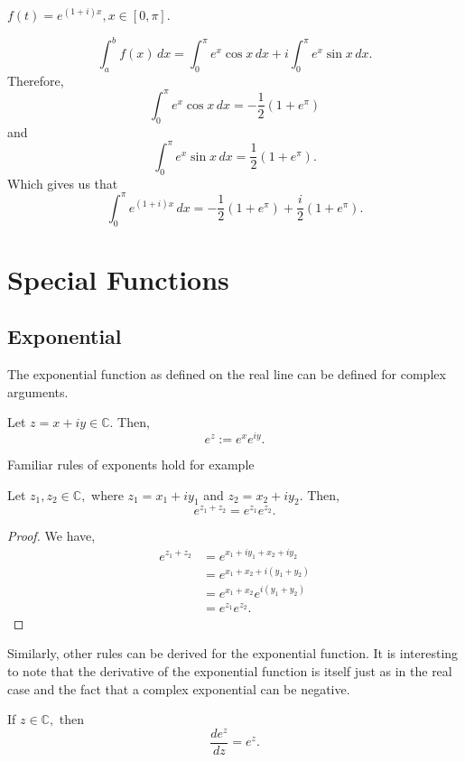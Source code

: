 \documentclass[12pt]{book}
\begin{document}
\begin{exmp}
    $f(t) = e^{(1 + i)x}, x \in [0, \pi].$
\end{exmp}
\[
    \int_{a}^{b} f(x)\,dx = \int_{0}^{\pi} e^{x}\cos x\,dx + i\int_{0}^{\pi} e^{x}\sin x\,dx.
\]
Therefore,
\[
    \int_{0}^{\pi} e^{x}\cos x\,dx = -\frac{1}{2}(1 + e^{\pi})
\]
and
\[
    \int_{0}^{\pi} e^{x}\sin x\,dx = \frac{1}{2}(1 + e^{\pi}).
\]
Which gives us that 
\[
    \int_{0}^{\pi} e^{(1 + i)x}\,dx = -\frac{1}{2}(1 + e^{\pi}) + \frac{i}{2}(1 + e^{\pi}).
\]

\section{Special Functions}
\subsection{Exponential}
The exponential function as defined on the real line can be defined for complex arguments. 
\begin{defn}
    Let $z = x + iy \in \mathbb{C}.$ Then,
    \[
        e^{z} := e^{x}e^{iy}.
    \]
\end{defn}
Familiar rules of exponents hold for example 
\begin{thm}
    Let $z_1, z_2 \in \mathbb{C},$ where $z_1 = x_1 + iy_1$ and $z_2 = x_2 + iy_2$. Then,
    \[
        e^{z_1 + z_2} = e^{z_1}e^{z_2}.
    \]
\end{thm}
\begin{proof}
    We have,
    \begin{align*}
        e^{z_1 + z_2}
            &=
                e^{x_1 + iy_1 + x_2 + iy_2}\\
            &=
                e^{x_1 + x_2 + i(y_1 + y_2)}\\
            &=
                e^{x_1 + x_2}e^{i(y_1 + y_2)}\\
            &=
                e^{z_1}e^{z_2}.
    \end{align*}
\end{proof}
Similarly, other rules can be derived for the exponential function. It is interesting to note that the derivative of the exponential function is itself just as in the real case and the fact that a complex exponential can be negative. 
\begin{thm}
    If $z \in \mathbb{C},$ then
    \[
        \frac{d e^{z}}{d z} = e^{z}.
    \]
\end{thm}
\end{document}
